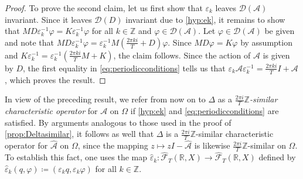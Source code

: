 \documentclass[english]{myarticle}
\begin{document}
\begin{sloppypar}
\begin{proof}
To prove the second claim, let us first show that $\varepsilon_k$ leaves $\mathcal{D}(\mathcal{A})$ invariant. Since it leaves $\mathcal{D}(D)$ invariant due to \ref{hyp:ek}, it remains to show that $MD \varepsilon_k^{-1}\varphi = K \varepsilon_k^{-1} \varphi $ for all $k \in \mathbb{Z}$ and $\varphi \in \mathcal{D}(\mathcal{A})$. Let $\varphi \in \mathcal{D}(\mathcal{A})$ be given and note that $MD\varepsilon_k^{-1} \varphi =  \varepsilon_k^{-1} M(\frac{2 \pi k i}{T} + D)\varphi$. Since $MD \varphi = K \varphi$ by assumption and $K \varepsilon_{k}^{-1} = \varepsilon_k^{-1}(\frac{2 \pi k i}{T}M + K)$, the claim follows. Since the action of $\mathcal{A} $ is given by $D$, the first equality in \eqref{eq:periodicconditions} tells us that $\varepsilon_k \mathcal{A} \varepsilon_k^{-1} = \frac{2 \pi k i}{T} I + \mathcal{A}$, which proves the result.
\end{proof}
In view of the preceding result, we refer from now on to $\Delta$ as a $\frac{2\pi i}{T}\mathbb{Z}$\emph{-similar characteristic operator} for $\mathcal{A}$ on $\Omega$ if \ref{hyp:ek} and \eqref{eq:periodicconditions} are satisfied. By arguments analogous to those used in the proof of \cref{prop:Deltasimilar}, it follows as well that $\Delta$ is a $\frac{2\pi i}{T}\mathbb{Z}$-similar characteristic operator for $\hat{\mathcal{A}}$ on $\Omega$, since the mapping $z \mapsto zI-\hat{\mathcal{A}}$ is likewise $\frac{2\pi i}{T}\mathbb{Z}$-similar on $\Omega$. To establish this fact, one uses the map $\hat{\varepsilon}_k : \hat{\mathcal{F}}_T(\mathbb{R},X) \to \hat{\mathcal{F}}_T(\mathbb{R},X)$ defined by $ \hat{\varepsilon}_k (q,\varphi)\coloneqq(\varepsilon_k q,\varepsilon_k\varphi)$ for all $k \in \mathbb{Z}$.


\end{sloppypar}
\end{document}
